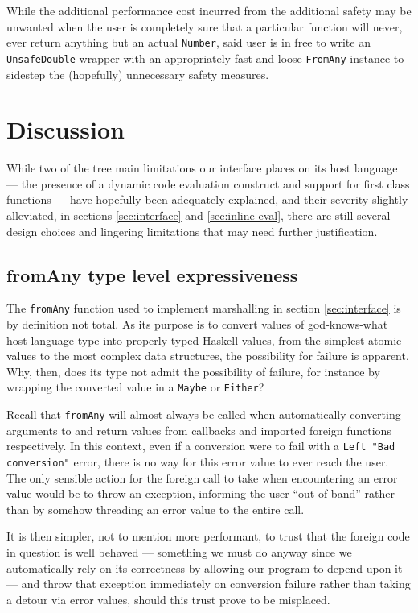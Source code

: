 \documentclass{sigplanconf}
\begin{document}
While the additional performance cost incurred from the additional safety may
be unwanted when the user is completely sure that a particular function
will never, ever return anything but an actual \lstinline!Number!, said user
is in free to write an \lstinline!UnsafeDouble! wrapper with an appropriately
fast and loose \lstinline!FromAny! instance to sidestep the (hopefully)
unnecessary safety measures.

\section{Discussion}\label{sec:discussion}
While two of the tree main limitations our interface places on its host
language --- the presence of a dynamic code evaluation construct and support for
first class functions --- have hopefully been adequately explained, and their
severity slightly alleviated, in sections \ref{sec:interface} and
\ref{sec:inline-eval}, there are still several design choices and lingering
limitations that may need further justification.

\subsection{fromAny type level expressiveness}
The \lstinline!fromAny! function used to implement marshalling in section
\ref{sec:interface} is by definition not total. As its purpose is to
convert values of god-knows-what host language type into properly typed Haskell
values, from the simplest atomic values to the most complex data structures,
the possibility for failure is apparent. Why, then, does its type not admit
the possibility of failure, for instance by wrapping the converted value in a
\lstinline!Maybe! or \lstinline!Either!?

Recall that \lstinline!fromAny! will almost always be called when
automatically converting arguments to and return values from callbacks and
imported foreign functions respectively. In this context, even if a conversion
were to fail with a \lstinline!Left "Bad conversion"! error, there is no way
for this error value to ever reach the user. The only sensible action for the
foreign call to take when encountering an error value would be to throw an
exception, informing the user ``out of band'' rather than by somehow threading
an error value to the entire call.

It is then simpler, not to mention more performant, to trust that the foreign
code in question is well behaved --- something we must do anyway since we
automatically rely on its correctness by allowing our program to depend upon
it --- and throw that exception immediately on conversion failure rather than
taking a detour via error values, should this trust prove to be misplaced.
\end{document}
